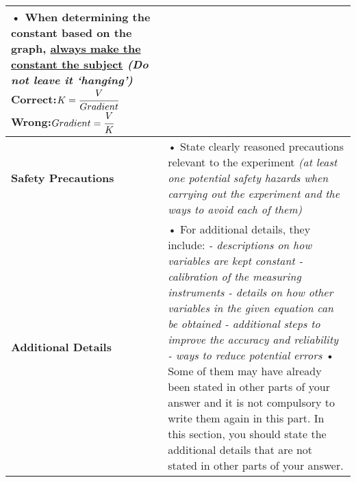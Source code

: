 \documentclass{article}
\begin{document}
\begin{longtable}{|p{5cm}|p{11.5cm}|}
    •	When determining the constant based on the graph, \underline{\textbf{always make the constant the subject}}\textit{ (Do not leave it ‘hanging’)}\newline\newline
    \textbf{Correct}:$K=\cfrac{V}{Gradient}$\newline\newline
    \textbf{Wrong}:$Gradient=\cfrac{V}{K}$\\
    \hline
    \textbf{Safety Precautions}&•	State clearly reasoned precautions relevant to the experiment \textit{(at least one potential safety hazards when carrying out the experiment and the ways to avoid each of them)}\\
    \hline
    \textbf{Additional Details}&•	For additional details, they include:\newline
    \textit{-	descriptions on how variables are kept     constant\newline
    -	calibration of the measuring instruments\newline
    -	details on how other variables in the given equation can be obtained\newline
    -	additional steps to improve the accuracy and reliability\newline
    -	ways to reduce potential errors\newline}
    •	Some of them may have already been stated in other parts of your answer and it is not compulsory to write them again in this part. In this section, you should state the additional details that are not stated in other parts of your answer.\\
    \hline
    \end{longtable}
\end{document}

